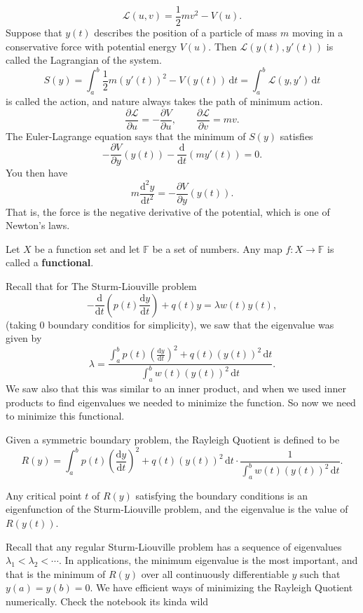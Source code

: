 \[
	\mathcal{L} (u,v)=\frac{1}{2}mv^2-V(u)
.\]
Suppose that $y(t)$ describes the position of a particle of mass $m$ moving in a conservative force with potential energy $V(u)$. Then $\mathcal{L} (y(t),y'(t))$ is called the Lagrangian of the system.
\[
	S(y)=\int_{a}^{b} \frac{1}{2}m(y'(t))^2-V(y(t)) \,\mathrm{d} t=\int_{a}^{b} \mathcal{L} (y,y') \,\mathrm{d} t
\]
is called the action, and nature always takes the path of minimum action.
\[
	\frac{\partial \mathcal{L} }{\partial u} =-\frac{\partial V}{\partial u} ,\qquad \frac{\partial \mathcal{L} }{\partial v} =mv
.\]
 The Euler-Lagrange equation says that the minimum of $S(y)$ satisfies
 \[
 	-\frac{\partial V}{\partial y} (y(t))-\frac{\mathrm{d}}{\mathrm{d}t} (my'(t))=0
 .\]
 You then have
 \[
 	m \frac{\mathrm{d}^2y}{\mathrm{d}t^2} =-\frac{\partial V}{\partial y} (y(t))
 .\]
 That is, the force is the negative derivative of the potential, which is one of Newton's laws.
 \begin{definition}[Functional]\label{dfn:ls}
 	Let $X$ be a function set and let $\mathbb{F}$ be a set of numbers. Any map $f : X \to \mathbb{F}$ is called a \textbf{functional}.
 \end{definition}

 Recall that for The Sturm-Liouville problem
 \[
 	-\frac{\mathrm{d}}{\mathrm{d}t} \left( p(t) \frac{\mathrm{d}y}{\mathrm{d}t}  \right) +q(t)y=\lambda w(t)y(t)
 ,\]
 (taking 0 boundary conditios for simplicity), we saw that the eigenvalue was given by
 \[
 	\lambda =\frac{\int_{a}^{b} p(t) \left( \frac{\mathrm{d}y}{\mathrm{d}t}  \right)^2+q(t)(y(t))^2  \,\mathrm{d} t}{\int_{a}^{b} w(t)(y(t))^2 \,\mathrm{d} t}
 .\]
We saw also that this was similar to an inner product, and when we used inner products to find eigenvalues we needed to minimize the function. So now we need to minimize this functional.

Given a symmetric boundary problem, the Rayleigh Quotient is defined to be
\[
	R(y)= \int_{a}^{b} p(t)\left( \frac{\mathrm{d}y}{\mathrm{d}t}  \right) ^2+q(t)(y(t))^2 \,\mathrm{d} t \cdot \frac{1}{\int_{a}^{b} w(t)(y(t))^2 \,\mathrm{d} t}
.\]
\begin{proposition}
	Any critical point $t$ of $R(y)$ satisfying the boundary conditions is an eigenfunction of the Sturm-Liouville problem, and the eigenvalue is the value of $R(y(t))$.
\end{proposition}

Recall that any regular Sturm-Liouville problem has a sequence of eigenvalues $\lambda_1<\lambda_2<\cdots$. In applications, the minimum eigenvalue is the most important, and that is the minimum of $R(y)$ over all continuously differentiable $y$ such that $y(a)=y(b)=0$. We have efficient ways of minimizing the Rayleigh Quotient numerically. Check the notebook its kinda wild
